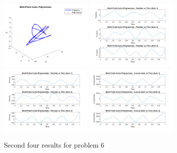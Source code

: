 \documentclass[conference]{IEEEtran}
\begin{document}
\begin{figure}[htbp]
    \centering
    \includegraphics[width=0.4\textwidth]{figures/prob6/fig_5.png}
    \includegraphics[width=0.4\textwidth]{figures/prob6/fig_6.png}
    \includegraphics[width=0.4\textwidth]{figures/prob6/fig_7.png}
    \includegraphics[width=0.4\textwidth]{figures/prob6/fig_8.png}
    \caption{Second four results for problem 6}
    \label{fig:res8}
\end{figure}
\end{document}
